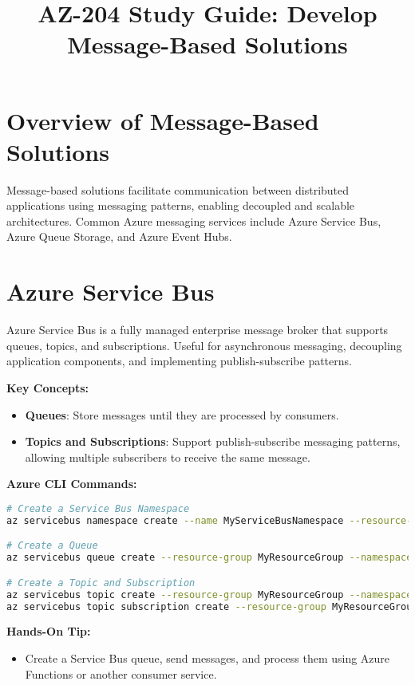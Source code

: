 \documentclass{article}
\title{AZ-204 Study Guide: Develop Message-Based Solutions}
\author{}
\date{}
\begin{document}
\maketitle

\section{Overview of Message-Based Solutions}
Message-based solutions facilitate communication between distributed applications using messaging patterns, enabling decoupled and scalable architectures. Common Azure messaging services include Azure Service Bus, Azure Queue Storage, and Azure Event Hubs.

\section{Azure Service Bus}
Azure Service Bus is a fully managed enterprise message broker that supports queues, topics, and subscriptions. Useful for asynchronous messaging, decoupling application components, and implementing publish-subscribe patterns.

\textbf{Key Concepts:}
\begin{itemize}
    \item \textbf{Queues}: Store messages until they are processed by consumers.
    \item \textbf{Topics and Subscriptions}: Support publish-subscribe messaging patterns, allowing multiple subscribers to receive the same message.
\end{itemize}

\textbf{Azure CLI Commands:}
\begin{lstlisting}[language=bash]
# Create a Service Bus Namespace
az servicebus namespace create --name MyServiceBusNamespace --resource-group MyResourceGroup --location eastus

# Create a Queue
az servicebus queue create --resource-group MyResourceGroup --namespace-name MyServiceBusNamespace --name MyQueue

# Create a Topic and Subscription
az servicebus topic create --resource-group MyResourceGroup --namespace-name MyServiceBusNamespace --name MyTopic
az servicebus topic subscription create --resource-group MyResourceGroup --namespace-name MyServiceBusNamespace --topic-name MyTopic --name MySubscription
\end{lstlisting}

\textbf{Hands-On Tip:}
\begin{itemize}
    \item Create a Service Bus queue, send messages, and process them using Azure Functions or another consumer service.
\end{itemize}
\end{document}

